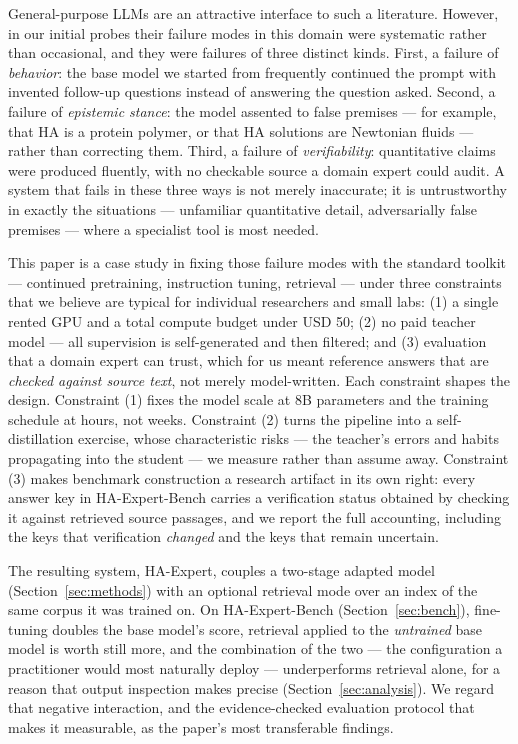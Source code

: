 \documentclass[11pt]{article}
\begin{document}
General-purpose LLMs are an attractive interface to such a literature.
However, in our initial probes their failure modes in this domain were
systematic rather than occasional, and they were failures of three
distinct kinds. First, a failure of \emph{behavior}: the base model we
started from frequently continued the prompt with invented follow-up
questions instead of answering the question asked. Second, a failure of
\emph{epistemic stance}: the model assented to false premises --- for
example, that HA is a protein polymer, or that HA solutions are Newtonian
fluids --- rather than correcting them. Third, a failure of
\emph{verifiability}: quantitative claims were produced fluently, with no
checkable source a domain expert could audit. A system that fails in these
three ways is not merely inaccurate; it is untrustworthy in exactly the
situations --- unfamiliar quantitative detail, adversarially false
premises --- where a specialist tool is most needed.

This paper is a case study in fixing those failure modes with the standard
toolkit --- continued pretraining, instruction tuning, retrieval --- under
three constraints that we believe are typical for individual researchers
and small labs: (1) a single rented GPU and a total compute budget under
USD 50; (2) no paid teacher model --- all supervision is self-generated
and then filtered; and (3) evaluation that a domain expert can trust,
which for us meant reference answers that are \emph{checked against source
text}, not merely model-written. Each constraint shapes the design.
Constraint (1) fixes the model scale at 8B parameters and the training
schedule at hours, not weeks. Constraint (2) turns the pipeline into a
self-distillation exercise, whose characteristic risks --- the teacher's
errors and habits propagating into the student --- we measure rather than
assume away. Constraint (3) makes benchmark construction a research
artifact in its own right: every answer key in HA-Expert-Bench carries a
verification status obtained by checking it against retrieved source
passages, and we report the full accounting, including the keys that
verification \emph{changed} and the keys that remain uncertain.

The resulting system, HA-Expert, couples a two-stage adapted model
(Section~\ref{sec:methods}) with an optional retrieval mode over an index
of the same corpus it was trained on. On HA-Expert-Bench
(Section~\ref{sec:bench}), fine-tuning doubles the base model's score,
retrieval applied to the \emph{untrained} base model is worth still more,
and the combination of the two --- the configuration a practitioner would
most naturally deploy --- underperforms retrieval alone, for a reason that
output inspection makes precise (Section~\ref{sec:analysis}). We regard
that negative interaction, and the evidence-checked evaluation protocol
that makes it measurable, as the paper's most transferable findings.
\end{document}
